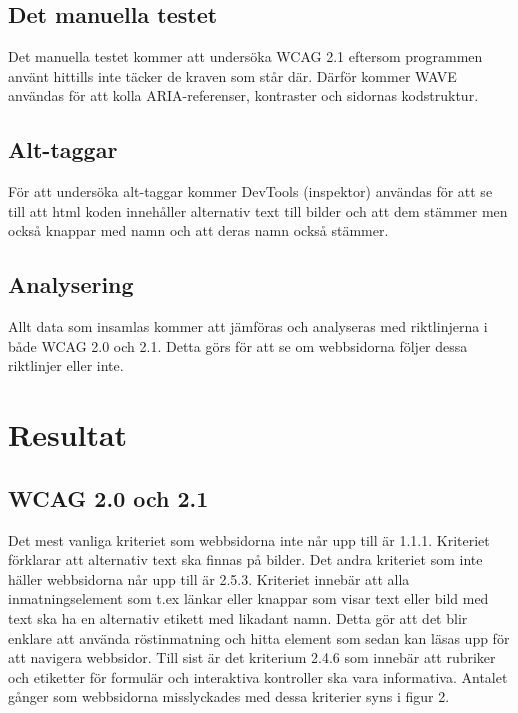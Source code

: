 \documentclass[11p]{article}
\begin{document}
    \subsection{Det manuella testet}
    Det manuella testet kommer att undersöka WCAG 2.1 eftersom programmen använt hittills inte täcker de kraven som står där.
    Därför kommer WAVE användas för att kolla ARIA-referenser, kontraster och sidornas kodstruktur.

    \subsection{Alt-taggar}
    För att undersöka alt-taggar kommer DevTools (inspektor) användas för att se till att html koden innehåller alternativ text till bilder och att dem stämmer men också knappar med namn och att deras namn också stämmer.

    \subsection{Analysering}

    Allt data som insamlas kommer att jämföras och analyseras med riktlinjerna i både WCAG 2.0 och 2.1.
    Detta görs för att se om webbsidorna följer dessa riktlinjer eller inte.

    \section{Resultat}
    
    \subsection{WCAG 2.0 och 2.1}
    Det mest vanliga kriteriet som webbsidorna inte når upp till är 1.1.1.
    Kriteriet förklarar att alternativ text ska finnas på bilder.
    Det andra kriteriet som inte häller webbsidorna når upp till är 2.5.3. Kriteriet innebär att alla inmatningselement som t.ex länkar eller knappar som visar text eller bild med text ska ha en alternativ etikett med likadant namn.
    Detta gör att det blir enklare att använda röstinmatning och hitta element som sedan kan läsas upp för att navigera webbsidor.
    Till sist är det kriterium 2.4.6 som innebär att rubriker och etiketter för formulär och interaktiva kontroller ska vara informativa.
    Antalet gånger som webbsidorna misslyckades med dessa kriterier syns i figur 2.
\end{document}
